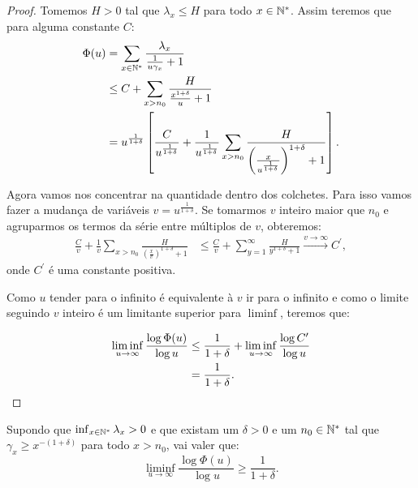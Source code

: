 \begin{proof}
  Tomemos $H > 0$ tal que $\lambda_x \leq H$ para todo $x \in
  {\mathbb{N^*}}$. Assim teremos que para alguma constante $C$:
  \begin{align*}
    \Phi(u) &= \sum_{x \in {\mathbb{N^*}}} \frac{\lambda_x}{\frac{1}{u\gamma_x} +
      1}\\
    &\leq C + \sum_{x > n_0} \frac{H}{\frac{x^{1+\delta}}{u} + 1}\\
    &=u^{\frac{1}{1+\delta}} \left[
      \frac{C}{u^{\frac{1}{1+\delta}}} +
      \frac{1}{u^{\frac{1}{1+\delta}}} \sum_{x > n_0} \frac{H}{
        \left( \frac{x}{u^{\frac{1}{1+\delta}}}  \right)^{1+\delta}
        + 1
      }
    \right].
  \end{align*}

  Agora vamos nos concentrar na quantidade dentro dos colchetes. Para
  isso vamos fazer a mudança de variáveis $v =
  u^{\frac{1}{1+\delta}}$. Se tomarmos $v$ inteiro maior que $n_0$ e
  agruparmos os termos da série entre múltiplos de $v$, obteremos:
  \begin{align*}
    \frac{C}{v} + \frac{1}{v} \sum_{x > n_0} \frac{H}{ \left(
        \frac{x}{v} \right)^{1+\delta} + 1 }
    &\leq
    \frac{C}{v} + \sum_{y=1}^{\infty} \frac{H}{y^{1+\delta} + 1}
    \xrightarrow{v \to \infty} C^\prime,
  \end{align*}
  onde $C^\prime$ é uma constante positiva.

  Como $u$ tender para o infinito é equivalente à $v$ ir para o
  infinito e como o limite seguindo $v$ inteiro é um limitante
  superior para $\liminf$, teremos que:

  \begin{align*}
    \liminf_{u \to \infty} \frac{\log \Phi(u)}{\log u} &\leq
    \frac{1}{1+\delta} + \liminf_{u \to \infty} 
    \frac{\log{C^\prime}}{\log u}\\
    &= \frac{1}{1+\delta} .
    \qedhere
  \end{align*}
\end{proof}

\begin{proposicao}
\label{prop:dominar-dim-haus-inf}
  Supondo que $\inf_{x\in{\mathbb{N^*}}}\lambda_x  > 0$ e que existam um
  $\delta>0$ e um $n_0 \in {\mathbb{N^*}}$ tal que $\gamma_x \geq x^{-(1+\delta)}$
  para todo $x > n_0$, vai valer que:
  \begin{equation}
    \liminf_{u \to \infty} \frac{\log \Phi(u)}{\log u}  \geq
    \frac{1}{1+\delta} .
  \end{equation}
\end{proposicao}

